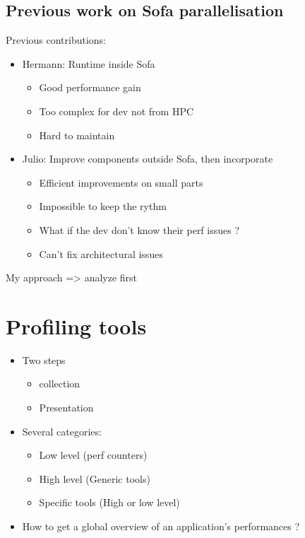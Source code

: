 \subsection{Previous work on Sofa parallelisation}

Previous contributions:
\begin{itemize}
    \item  Hermann: Runtime inside Sofa
        \begin{itemize}
            \item Good performance gain
            \item Too complex for dev not from HPC
            \item Hard to maintain
        \end{itemize}
    \item  Julio: Improve components outside Sofa, then incorporate
        \begin{itemize}
            \item Efficient improvements on small parts
            \item Impossible to keep the rythm
            \item What if the dev don't know their perf issues ?
            \item Can't fix architectural issues
        \end{itemize}
\end{itemize}

My approach => analyze first

\section{Profiling tools}
\label{sec:prof-tools}


\begin{itemize}
    \item Two steps
        \begin{itemize}
            \item collection
            \item Presentation
        \end{itemize}
    \item Several categories:
        \begin{itemize}
            \item Low level (perf counters)
            \item High level (Generic tools)
            \item Specific tools (High or low level)
        \end{itemize}
    \item How to get a global overview of an application's performances ?
\end{itemize}

